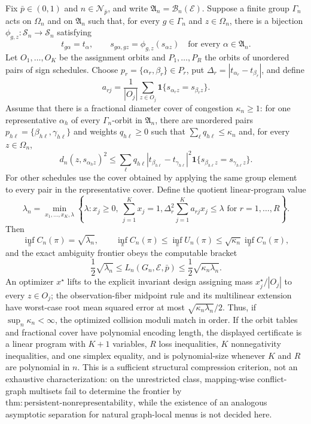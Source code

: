 Fix \(\bar p\in(0,1)\) and \(n\in\mathcal N_{\bar p}\), and write \(\mathfrak A_n=\mathcal B_n(\mathcal E)\). Suppose a finite group \(\Gamma_n\) acts on \(\Omega_n\) and on \(\mathfrak A_n\) such that, for every \(g\in\Gamma_n\) and \(z\in\Omega_n\), there is a bijection \(\phi_{g,z}:\mathcal S_n\to\mathcal S_n\) satisfying
\[
 t_{g\alpha}=t_\alpha,
 \qquad
 s_{g\alpha,gz}=\phi_{g,z}(s_{\alpha z})
 \quad\text{for every }\alpha\in\mathfrak A_n.
\]
Let \(O_1,\ldots,O_K\) be the assignment orbits and \(P_1,\ldots,P_R\) the orbits of unordered pairs of sign schedules. Choose \(p_r=\{\alpha_r,\beta_r\}\in P_r\), put \(\Delta_r=|t_{\alpha_r}-t_{\beta_r}|\), and define
\[
 a_{rj}=\frac{1}{|O_j|}\sum_{z\in O_j}
 \mathbf 1\{s_{\alpha_r z}=s_{\beta_r z}\}.
\]
Assume that there is a fractional diameter cover of congestion \(\kappa_n\ge1\): for one representative \(\alpha_h\) of every \(\Gamma_n\)-orbit in \(\mathfrak A_n\), there are unordered pairs \(p_{h\ell}=\{\beta_{h\ell},\gamma_{h\ell}\}\) and weights \(q_{h\ell}\ge0\) such that \(\sum_\ell q_{h\ell}\le\kappa_n\) and, for every \(z\in\Omega_n\),
\[
 d_n(z,s_{\alpha_h z})^2
 \le
 \sum_\ell q_{h\ell}
 |t_{\beta_{h\ell}}-t_{\gamma_{h\ell}}|^2
 \mathbf 1\{s_{\beta_{h\ell}z}=s_{\gamma_{h\ell}z}\}.
\]
For other schedules use the cover obtained by applying the same group element to every pair in the representative cover. Define the quotient linear-program value
\[
 \lambda_n=\min_{x_1,\ldots,x_K,\lambda}
 \left\{\lambda:
 x_j\ge0,\ \sum_{j=1}^Kx_j=1,
 \Delta_r^2\sum_{j=1}^K a_{rj}x_j\le\lambda
 \text{ for }r=1,\ldots,R\right\}.
\]
Then
\[
 \inf_\pi C_n(\pi)=\sqrt{\lambda_n},
 \qquad
 \inf_\pi C_n(\pi)
 \le \inf_\pi U_n(\pi)
 \le \sqrt{\kappa_n}\inf_\pi C_n(\pi),
\]
and the exact ambiguity frontier obeys the computable bracket
\[
 \frac12\sqrt{\lambda_n}
 \le L_n(G_n,\mathcal E,\bar p)
 \le \frac12\sqrt{\kappa_n\lambda_n}.
\]
An optimizer \(x^\star\) lifts to the explicit invariant design assigning mass \(x_j^\star/|O_j|\) to every \(z\in O_j\); the observation-fiber midpoint rule and its multilinear extension have worst-case root mean squared error at most \(\sqrt{\kappa_n\lambda_n}/2\). Thus, if \(\sup_n\kappa_n<\infty\), the optimized collision moduli match in order. If the orbit tables and fractional cover have polynomial encoding length, the displayed certificate is a linear program with \(K+1\) variables, \(R\) loss inequalities, \(K\) nonnegativity inequalities, and one simplex equality, and is polynomial-size whenever \(K\) and \(R\) are polynomial in \(n\). This is a sufficient structural compression criterion, not an exhaustive characterization: on the unrestricted class, mapping-wise conflict-graph multisets fail to determine the frontier by \(\mathrm{thm{:}persistent\text{-}nonrepresentability}\), while the existence of an analogous asymptotic separation for natural graph-local menus is not decided here.